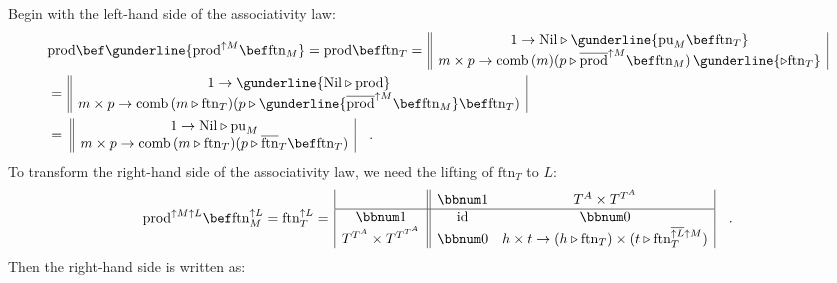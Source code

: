 Begin with the left-hand side of the associativity law:
\begin{align*}
 & \text{prod}\bef\gunderline{\text{prod}^{\uparrow M}\bef\text{ftn}_{M}}=\text{prod}\bef\text{ftn}_{T}=\,\begin{array}{||c|}
1\rightarrow\text{Nil}\triangleright\gunderline{\text{pu}_{M}\bef\text{ftn}_{T}}\\
m\times p\rightarrow\text{comb}\,(m)(p\triangleright\overline{\text{prod}}^{\uparrow M}\bef\text{ftn}_{M})\,\gunderline{\triangleright\text{ftn}_{T}}
\end{array}\\
 & =\,\begin{array}{||c|}
1\rightarrow\gunderline{\text{Nil}\triangleright\text{prod}}\\
m\times p\rightarrow\text{comb}\,(m\triangleright\text{ftn}_{T})(p\triangleright\gunderline{\overline{\text{prod}}^{\uparrow M}\bef\text{ftn}_{M}}\bef\text{ftn}_{T})
\end{array}\\
 & =\,\,\begin{array}{||c|}
1\rightarrow\text{Nil}\triangleright\text{pu}_{M}\\
m\times p\rightarrow\text{comb}\,(m\triangleright\text{ftn}_{T})(p\triangleright\overline{\text{ftn}}_{T}\bef\text{ftn}_{T})
\end{array}\quad.
\end{align*}
To transform the right-hand side of the associativity law, we need
the lifting of $\text{ftn}_{T}$ to $L$:
\[
\text{prod}^{\uparrow M\uparrow L}\bef\text{ftn}_{M}^{\uparrow L}=\text{ftn}_{T}^{\uparrow L}=\,\begin{array}{|c||cc|}
 & \bbnum 1 & T^{A}\times T^{T^{A}}\\
\hline \bbnum 1 & \text{id} & \bbnum 0\\
T^{T^{A}}\times T^{T^{T^{A}}} & \bbnum 0 & h\times t\rightarrow(h\triangleright\text{ftn}_{T})\times(t\triangleright\text{ftn}_{T}^{\overline{\uparrow L}\uparrow M})
\end{array}\quad.
\]
Then the right-hand side is written as:
